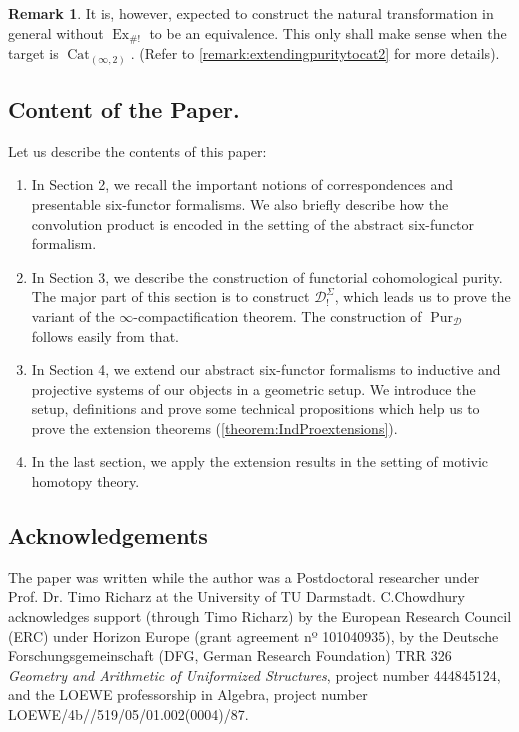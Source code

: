 \documentclass[14pt]{article}
\theoremstyle{definition}
\newtheorem{remark}[theorem]{Remark}
\newcommand{\D}{\mathcal{D}}
\newcommand{\op}[1]{\operatorname{#1}}
\numberwithin{subsection}{section}
\begin{document}
\begin{remark}
    It is, however, expected to construct the natural transformation in general without $\op{Ex}_{\#!}$ to be an equivalence. This only shall make sense when the target is $\op{Cat}_{(\infty,2)}$. (Refer to \cref{remark:extendingpuritytocat2} for more details).
\end{remark}


\subsection{Content of the Paper.}
Let us describe the contents of this paper:
\begin{enumerate}
    \item In Section 2, we recall the important notions of  correspondences and presentable six-functor formalisms. We also briefly describe how the convolution product is encoded in the setting of the abstract six-functor formalism.
    \item In Section 3, we describe the  construction of functorial cohomological purity. The major part of this section is to construct $\D^{\Sigma}_!$, which leads us to prove the variant of the $\infty$-compactification theorem. The construction of $\op{Pur}_{\D}$ follows easily from that. 
    \item In Section 4, we extend our abstract six-functor formalisms to inductive and projective systems of our objects in a geometric setup. We introduce the setup, definitions and prove some technical propositions which help us to prove the extension theorems (\cref{theorem:IndProextensions}).
    \item In the last section, we apply the extension results in the setting of  motivic homotopy theory.
\end{enumerate}

\subsection*{Acknowledgements}

The paper was written while the author was a Postdoctoral researcher under Prof. Dr. Timo Richarz at the University of TU Darmstadt. C.Chowdhury acknowledges support (through Timo Richarz) by the European Research Council (ERC) under Horizon Europe (grant agreement nº 101040935), by the Deutsche Forschungsgemeinschaft (DFG, German Research Foundation) TRR 326 \textit{Geometry and Arithmetic of Uniformized Structures}, project number 444845124, and the LOEWE professorship in Algebra, project number LOEWE/4b//519/05/01.002(0004)/87. \\
\end{document}

